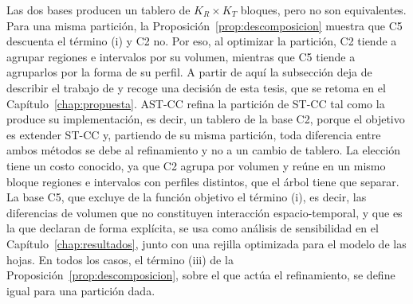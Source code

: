 Las dos bases producen un tablero de $K_R \times K_T$ bloques, pero no son
equivalentes. Para una misma partición, la Proposición~\ref{prop:descomposicion} muestra que C5 descuenta
el término (i) y C2 no. Por eso, al optimizar la partición, C2 tiende a agrupar
regiones e intervalos por su volumen, mientras que C5 tiende a agruparlos por la
forma de su perfil.
A partir de aquí la subsección deja de describir el trabajo de \citet{Liu2021} y
recoge una decisión de esta tesis, que se retoma en el
Capítulo~\ref{chap:propuesta}. AST-CC refina la partición de ST-CC tal como la
produce su implementación, es decir, un tablero de la base C2, porque el objetivo
es extender ST-CC y, partiendo de su misma partición, toda diferencia entre ambos
métodos se debe al refinamiento y no a un cambio de tablero. La elección tiene un
costo conocido, ya que C2 agrupa por volumen y reúne en un mismo bloque regiones e
intervalos con perfiles distintos, que el árbol tiene que separar. La base C5, que
excluye de la función objetivo el término (i), es decir, las diferencias de volumen
que no constituyen interacción espacio-temporal, y que es la que \citet{Liu2021}
declaran de forma explícita, se usa como análisis de sensibilidad en el
Capítulo~\ref{chap:resultados}, junto con una rejilla optimizada para el modelo de
las hojas. En todos los casos, el término (iii) de la
Proposición~\ref{prop:descomposicion}, sobre el que actúa el refinamiento, se
define igual para una partición dada.

